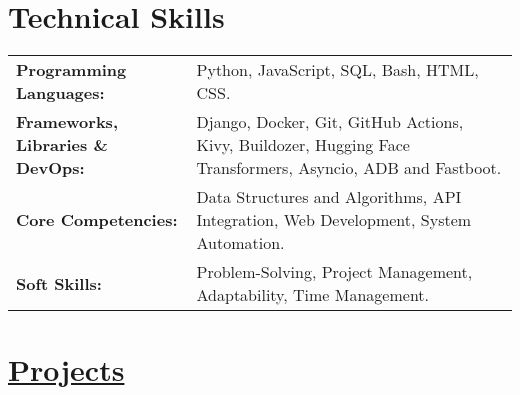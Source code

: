 \documentclass[a4paper,10pt]{article}
\begin{document}
\section{Technical Skills}
\vspace{2.5pt}
\begin{tabularx}{\linewidth}{@{} l X @{}}
    \textbf{Programming Languages:} & Python, JavaScript, SQL, Bash, HTML, CSS. \\
    \vspace{2.5pt}
    \textbf{Frameworks, Libraries \& DevOps:} & Django, Docker, Git, GitHub Actions, Kivy, Buildozer, Hugging Face Transformers, Asyncio, ADB and Fastboot. \\
    \vspace{2.5pt}
    \textbf{Core Competencies:} & Data Structures and Algorithms, API Integration, Web Development, System Automation. \\
    \vspace{2.5pt}
    \textbf{Soft Skills:} & Problem-Solving, Project Management, Adaptability, Time Management. \\
\end{tabularx}

\vspace{3pt}

\newcommand{\projectentry}[5]{%
    \noindent\vspace{5pt}
    \textcolor{myblue}{\textbf{\href{#2}{#1}}} \textcolor{mydarkblue}{\href{#3}{\faLink}} %
    \hfill {\small\textbf{\textcolor{mylightpurple}{#5}}} \\ \vspace{-10pt} %

    \begin{itemize}[left=0pt, label=--, nosep]
        \item \vspace{-10pt}\textbf{Overview:} #4
    \end{itemize}
    \vspace{0pt} %
}


\vspace{-3pt}
\section{\href{https://github.com/deekshith0509?tab=repositories}{Projects}}
\end{document}
